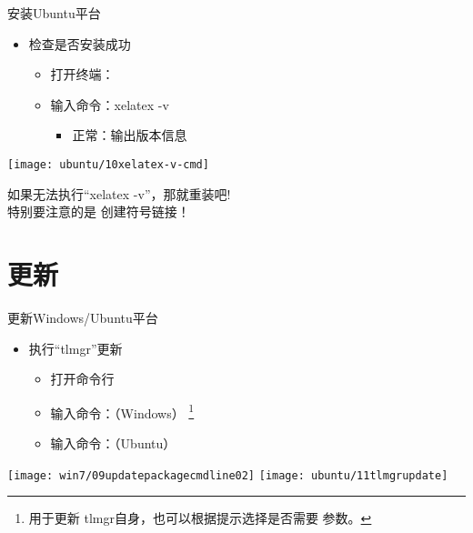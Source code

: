 \documentclass[fontset = none, t]{ctexbeamer}
\begin{document}
\begin{frame}{安装\tl}{Ubuntu平台}
  \begin{spacing}{1.2}
    \begin{itemize}
    \item 检查\tl 是否安装成功
      \begin{itemize}
      \item 打开终端：\setmenukeyswin {}
      \item 输入命令：xelatex -v
        \begin{itemize}
        \item 正常：输出\alert{版本}信息          
        \end{itemize}
      \end{itemize}
    \end{itemize}
    \begin{center}
      \texttt{[image: ubuntu/10xelatex-v-cmd]}
    \end{center}
  \end{spacing}
\end{frame}

\begin{frame}
  如果无法执行\enquote{xelatex -v}，那就重装\tl 吧!\\特别要注意的是
  \alert{创建符号链接}！
\end{frame}

\section[更新\TeXLive]{更新\tl}
\begin{frame}{更新\tl}{Windows/Ubuntu平台}
  \begin{spacing}{1.5}
    \begin{itemize}
    \item 执行\enquote{tlmgr}更新\tl %
      \begin{itemize}
      \item 打开命令行
      \item 输入命令：（Windows）
        \footnote[frame,1]{用于更新
          tlmgr自身，也可以根据提示选择是否需要
          参数。}
      \item 输入命令：（Ubuntu）        
      \end{itemize}
    \end{itemize}
    \begin{center}
      \texttt{[image: win7/09updatepackagecmdline02]}
      \texttt{[image: ubuntu/11tlmgrupdate]}
    \end{center}
  \end{spacing}
\end{frame}
\end{document}
